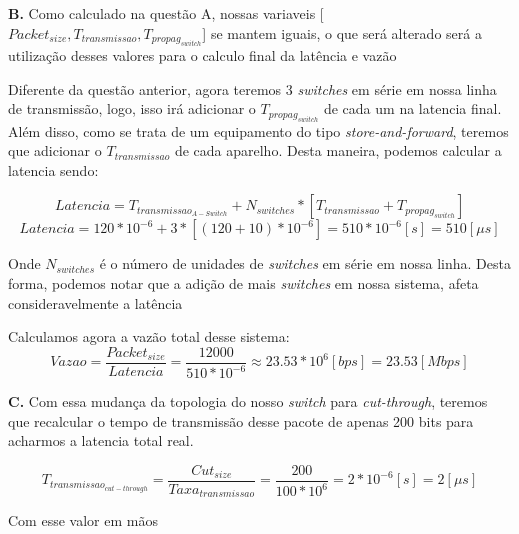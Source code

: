 \textbf{B. }
Como calculado na questão A, nossas variaveis [${Packet_{size}, T_{transmissao}, T_{propag_{switch}}}$] se mantem iguais, o que será alterado será a utilização desses valores para o calculo final da latência e vazão

Diferente da questão anterior, agora teremos 3 \textit{switches} em série em nossa linha de transmissão, logo, isso irá adicionar o ${T_{propag_{switch}}}$ de cada um na latencia final. Além disso, como se trata de um equipamento do tipo \textit{store-and-forward}, teremos que adicionar o $T_{transmissao}$ de cada aparelho. Desta maneira, podemos calcular a latencia sendo:

\begin{equation}
	Latencia = T_{transmissao_{A-Switch}} + N_{switches}*[T_{transmissao} + T_{propag_{switch}}]
\end{equation}
\begin{equation}
	Latencia = 120*10^{-6} + 3*[(120 + 10)*10^{-6}] = 510 * 10^{-6} [s] = 510 [\mu s] 
\end{equation}

Onde $N_{switches}$ é o número de unidades de \textit{switches} em série em nossa linha.
Desta forma, podemos notar que a adição de mais \textit{switches} em nossa sistema, afeta consideravelmente a latência

Calculamos agora a vazão total desse sistema:
\begin{equation}
	Vazao = \frac{Packet_{size}}{Latencia} = \frac{12000}{510 * 10^{-6}} \approx 23.53 * 10^6 [bps] = 23.53 [Mbps]
\end{equation}

\textbf{C. }
Com essa mudança da topologia do nosso \textit{switch} para \textit{cut-through}, teremos que recalcular o tempo de transmissão desse pacote de apenas 200 bits para acharmos a latencia total real.

\begin{equation}
	T_{transmissao_{cut-through}} = \frac{Cut_{size}}{Taxa_{transmissao}} = \frac{200}{100 * 10^6} =  2*10^{-6} [s] = 2 [\mu s]
\end{equation}

Com esse valor em mãos